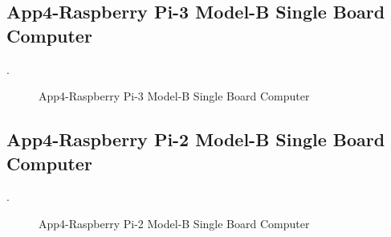 \clearpage
\pagebreak

\subsection{App4-Raspberry Pi-3 Model-B Single Board Computer}. 

\begin{figure}[htbp]
	\begin{center}
		\caption{App4-Raspberry Pi-3 Model-B Single Board Computer}
		\label{fig:App4-Captured-Raspberry-Pi3-ModelB-SBC.jpg}
	\end{center}
\end{figure}

\subsection{App4-Raspberry Pi-2 Model-B Single Board Computer}.

\begin{figure}[htbp]
	\begin{center}
		\caption{App4-Raspberry Pi-2 Model-B Single Board Computer}
		\label{fig:App4-Captured-Raspberry-Pi2-ModelB-SBC.jpg}
	\end{center}
\end{figure}

